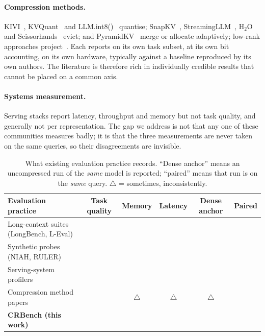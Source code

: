 \documentclass{article}
\theoremstyle{definition}
\newcommand{\cmark}{\textcolor{green!55!black}{\ding{51}}}
\newcommand{\xmark}{\textcolor{red!65!black}{\ding{55}}}
\begin{document}
\paragraph{Compression methods.} KIVI~\citep{liu2024kivi}, KVQuant~\citep{hooper2024kvquant} and LLM.int8()~\citep{dettmers2022llmint8} quantise; SnapKV~\citep{li2024snapkv}, StreamingLLM~\citep{xiao2023streamingllm}, $\text{H}_2\text{O}$~\citep{zhang2023h2o} and Scissorhands~\citep{liu2023scissorhands} evict; \citet{ge2023model} and PyramidKV~\citep{zhang2024pyramidkv} merge or allocate adaptively; low-rank approaches project~\citep{sharma2023truth}. Each reports on its own task subset, at its own bit accounting, on its own hardware, typically against a baseline reproduced by its own authors. The literature is therefore rich in individually credible results that cannot be placed on a common axis.

\paragraph{Systems measurement.} Serving stacks report latency, throughput and memory but not task quality, and generally not per representation. The gap we address is not that any one of these communities measures badly; it is that the three measurements are never taken on the same queries, so their disagreements are invisible.

\begin{table}[t]
\centering
\small
\setlength{\tabcolsep}{4.5pt}
\caption{What existing evaluation practice records. ``Dense anchor'' means an uncompressed run of the \emph{same} model is reported; ``paired'' means that run is on the \emph{same} query. $\triangle$ = sometimes, inconsistently.}
\label{tab:paradigms}
\begin{tabular}{lccccc}
\toprule
\textbf{Evaluation practice} & \textbf{Task quality} & \textbf{Memory} & \textbf{Latency} & \textbf{Dense anchor} & \textbf{Paired} \\
\midrule
Long-context suites (LongBench, L-Eval) & \cmark & \xmark & \xmark & \xmark & \xmark \\
Synthetic probes (NIAH, RULER) & \cmark & \xmark & \xmark & \xmark & \xmark \\
Serving-system profilers & \xmark & \cmark & \cmark & \xmark & \xmark \\
Compression method papers & \cmark & $\triangle$ & $\triangle$ & $\triangle$ & \xmark \\
\textbf{CRBench (this work)} & \cmark & \cmark & \cmark & \cmark & \cmark \\
\bottomrule
\end{tabular}
\end{table}
\end{document}
